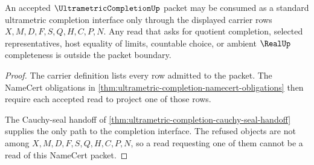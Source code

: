\begin{theorem}
\label{thm:ultrametric-completion-standard-interface-boundary}
An accepted $\UltrametricCompletionUp$ packet may be consumed as a standard ultrametric completion interface only through the displayed carrier rows $X,M,D,F,S,Q,H,C,P,N$. Any read that asks for quotient completion, selected representatives, host equality of limits, countable choice, or ambient $\RealUp$ completeness is outside the packet boundary.
\end{theorem}
\begin{proof}
The carrier definition lists every row admitted to the packet. The NameCert obligations in \autoref{thm:ultrametric-completion-namecert-obligations} then require each accepted read to project one of those rows.

The Cauchy-seal handoff of \autoref{thm:ultrametric-completion-cauchy-seal-handoff} supplies the only path to the completion interface. The refused objects are not among $X,M,D,F,S,Q,H,C,P,N$, so a read requesting one of them cannot be a read of this NameCert packet.
\end{proof}




